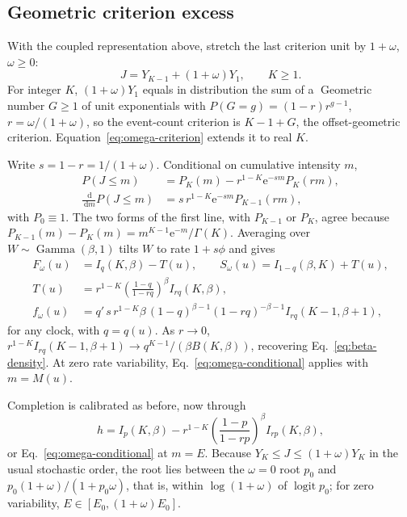\documentclass[12pt]{article}
\newcommand{\dd}{\,\mathrm{d}}
\newcommand{\e}{\mathrm{e}}
\newcommand{\GammaDist}{\operatorname{Gamma}}
\theoremstyle{definition}
\theoremstyle{plain}
\theoremstyle{remark}
\begin{document}
\subsection{Geometric criterion excess}\label{sec:omega}
With the coupled representation above, stretch the last criterion unit by $1+\omega$, $\omega\geq0$:
\begin{equation}
 J=Y_{K-1}+(1+\omega)Y_1,\qquad K\geq1.\label{eq:omega-criterion}
\end{equation}
For integer $K$, $(1+\omega)Y_1$ equals in distribution the sum of a $\operatorname{Geometric}$ number $G\geq1$ of unit exponentials with $P(G=g)=(1-r)r^{g-1}$, $r=\omega/(1+\omega)$, so the event-count criterion is $K-1+G$, the offset-geometric criterion. Equation~\eqref{eq:omega-criterion} extends it to real $K$.

Write $s=1-r=1/(1+\omega)$. Conditional on cumulative intensity $m$,
\begin{align}
 P(J\leq m)&=P_K(m)-r^{1-K}\e^{-sm}P_K(rm),\label{eq:omega-conditional}\\
 \frac{\dd}{\dd m}P(J\leq m)&=s\,r^{1-K}\e^{-sm}P_{K-1}(rm),
\end{align}
with $P_0\equiv1$. The two forms of the first line, with $P_{K-1}$ or $P_K$, agree because $P_{K-1}(m)-P_K(m)=m^{K-1}\e^{-m}/\Gamma(K)$. Averaging over $W\sim\GammaDist(\beta,1)$ tilts $W$ to rate $1+s\phi$ and gives
\begin{align}
 F_\omega(u)&=I_{q}(K,\beta)-T(u),\qquad S_\omega(u)=I_{1-q}(\beta,K)+T(u),\\
 T(u)&=r^{1-K}\left(\frac{1-q}{1-rq}\right)^\beta I_{rq}(K,\beta),\\
 f_\omega(u)&=q'\,s\,r^{1-K}\beta\,(1-q)^{\beta-1}(1-rq)^{-\beta-1}I_{rq}(K-1,\beta+1),\label{eq:omega-law}
\end{align}
for any clock, with $q=q(u)$. As $r\to0$, $r^{1-K}I_{rq}(K-1,\beta+1)\to q^{K-1}/(\beta B(K,\beta))$, recovering Eq.~\eqref{eq:beta-density}. At zero rate variability, Eq.~\eqref{eq:omega-conditional} applies with $m=M(u)$.

Completion is calibrated as before, now through
\begin{equation}
 h=I_p(K,\beta)-r^{1-K}\left(\frac{1-p}{1-rp}\right)^\beta I_{rp}(K,\beta),\label{eq:omega-h}
\end{equation}
or Eq.~\eqref{eq:omega-conditional} at $m=E$. Because $Y_K\leq J\leq(1+\omega)Y_K$ in the usual stochastic order, the root lies between the $\omega=0$ root $p_0$ and $p_0(1+\omega)/(1+p_0\omega)$, that is, within $\log(1+\omega)$ of $\operatorname{logit}p_0$; for zero variability, $E\in[E_0,(1+\omega)E_0]$.
\end{document}
